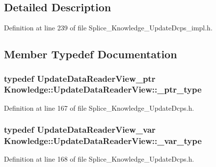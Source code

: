 \subsection{Detailed Description}


Definition at line 239 of file Splice\_\-Knowledge\_\-UpdateDcps\_\-impl.h.



\subsection{Member Typedef Documentation}
\hypertarget{classKnowledge_1_1UpdateDataReaderView_a4c3a2a03673aca411627e9dbb1bf9dcf}{
\subsubsection[{\_\-ptr\_\-type}]{\setlength{\rightskip}{0pt plus 5cm}typedef {\bf UpdateDataReaderView\_\-ptr} {\bf Knowledge::UpdateDataReaderView::\_\-ptr\_\-type}}}
\label{dc/d54/classKnowledge_1_1UpdateDataReaderView_a4c3a2a03673aca411627e9dbb1bf9dcf}


Definition at line 167 of file Splice\_\-Knowledge\_\-UpdateDcps.h.

\hypertarget{classKnowledge_1_1UpdateDataReaderView_ae036155ce21cb7d4ce5659d67b0fb234}{
\subsubsection[{\_\-var\_\-type}]{\setlength{\rightskip}{0pt plus 5cm}typedef {\bf UpdateDataReaderView\_\-var} {\bf Knowledge::UpdateDataReaderView::\_\-var\_\-type}}}
\label{dc/d54/classKnowledge_1_1UpdateDataReaderView_ae036155ce21cb7d4ce5659d67b0fb234}


Definition at line 168 of file Splice\_\-Knowledge\_\-UpdateDcps.h.



